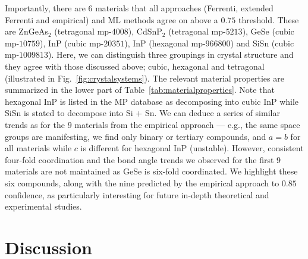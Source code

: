 \documentclass[superscriptaddress,unsortedaddress,
 amsmath,amssymb,
 aps,
]{revtex4-2}
\begin{document}
Importantly, there are $6$ materials that all approaches (Ferrenti, extended Ferrenti and empirical) and ML methods agree on above a $0.75$ threshold. These are ZnGeAs$_2$ (tetragonal mp-$4008$), CdSnP$_2$ (tetragonal mp-$5213$), GeSe (cubic mp-$10759$), InP (cubic mp-$20351$), InP (hexagonal mp-$966800$) and SiSn (cubic mp-$1009813$). Here, we can distinguish three groupings in crystal structure and they agree with those discussed above; cubic, hexagonal and tetragonal (illustrated in Fig.~\ref{fig:crystalsystems}). The relevant material properties are summarized in the lower part of Table~\ref{tab:materialproperties}. 
Note that hexagonal InP is listed in the MP database as decomposing into cubic InP while SiSn is stated to decompose into Si $+$ Sn. 
We can deduce a series of similar trends as for the $9$ materials from the empirical approach --- e.g., the same space groups are manifesting, we find only binary or tertiary compounds, and $a=b$ for all materials while $c$ is different for hexagonal InP (unstable). However, consistent four-fold coordination and the bond angle trends we observed for the first $9$ materials are not maintained as GeSe is six-fold coordinated. 
We highlight these six compounds, along with the nine predicted by the empirical approach to $0.85$ confidence, as particularly interesting for future in-depth theoretical and experimental studies. 

\section*{Discussion}
\end{document}
